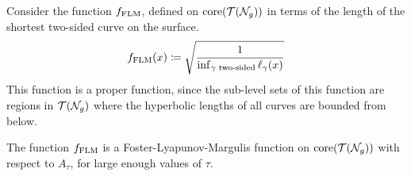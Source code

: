Consider the function $f_{\mathrm{FLM}}$, defined on $\mathrm{core}(\mathcal{T}(\mathcal{N}_g))$ in terms of the length of the shortest two-sided curve on the surface.
\begin{align*}
  f_{\mathrm{FLM}}(x) \coloneqq \sqrt{\frac{1}{\inf_{\text{$\gamma$ two-sided}}\ell_{\gamma}(x)}}
\end{align*}
This function is a proper function, since the sub-level sets of this function are regions in $\mathcal{T}(\mathcal{N}_g)$ where the hyperbolic lengths of all curves are bounded from below.

\begin{proposition}
  \label{prop:flm-is-flm}
  The function $f_{\mathrm{FLM}}$ is a Foster-Lyapunov-Margulis function on $\mathrm{core}(\mathcal{T}(\mathcal{N}_g))$ with respect to $A_{\tau}$, for large enough values of $\tau$.
\end{proposition}

